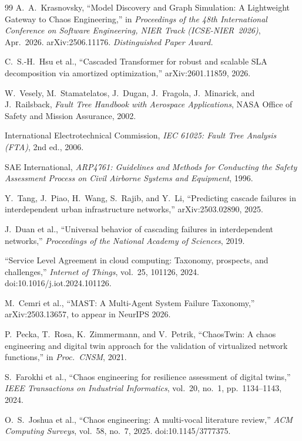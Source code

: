 \documentclass[10pt,twocolumn]{article}
\begin{document}
\begin{thebibliography}{99}
A.~A.~Krasnovsky,
``Model Discovery and Graph Simulation: A Lightweight Gateway to
Chaos Engineering,''
in \textit{Proceedings of the 48th International Conference on
Software Engineering, NIER Track (ICSE-NIER~2026)}, Apr.~2026.
arXiv:2506.11176.
\newblock \textit{Distinguished Paper Award.}

C.~S.-H.~Hsu et al.,
``Cascaded Transformer for robust and scalable SLA decomposition
via amortized optimization,'' arXiv:2601.11859, 2026.

W.~Vesely, M.~Stamatelatos, J.~Dugan, J.~Fragola, J.~Minarick, and
J.~Railsback,
\textit{Fault Tree Handbook with Aerospace Applications},
NASA Office of Safety and Mission Assurance, 2002.

International Electrotechnical Commission,
\textit{IEC 61025: Fault Tree Analysis (FTA)},
2nd ed., 2006.

SAE International,
\textit{ARP4761: Guidelines and Methods for Conducting the Safety
Assessment Process on Civil Airborne Systems and Equipment},
1996.

Y.~Tang, J.~Piao, H.~Wang, S.~Rajib, and Y.~Li,
``Predicting cascade failures in interdependent urban
infrastructure networks,'' arXiv:2503.02890, 2025.

J.~Duan et al.,
``Universal behavior of cascading failures in interdependent
networks,''
\textit{Proceedings of the National Academy of Sciences}, 2019.

``Service Level Agreement in cloud computing: Taxonomy, prospects,
and challenges,'' \textit{Internet of Things}, vol.~25, 101126,
2024. doi:10.1016/j.iot.2024.101126.

M.~Cemri et al.,
``MAST: A Multi-Agent System Failure Taxonomy,''
arXiv:2503.13657, to appear in NeurIPS 2026.

P.~Pecka, T.~Rosa, K.~Zimmermann, and V.~Petrik,
``ChaosTwin: A chaos engineering and digital twin approach for
the validation of virtualized network functions,''
in \textit{Proc.\ CNSM}, 2021.

S.~Farokhi et al.,
``Chaos engineering for resilience assessment of digital twins,''
\textit{IEEE Transactions on Industrial Informatics}, vol.~20,
no.~1, pp.~1134--1143, 2024.

O.~S.~Joshua et al.,
``Chaos engineering: A multi-vocal literature review,''
\textit{ACM Computing Surveys}, vol.~58, no.~7, 2025.
doi:10.1145/3777375.


\end{thebibliography}
\end{document}
